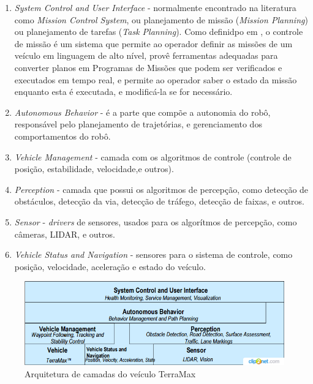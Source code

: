 \begin{enumerate}
  \item \textit{System Control and User Interface} - normalmente encontrado na
  literatura como \textit{Mission Control System}, ou planejamento de
missão (\textit{Mission Planning}) ou planejamento de tarefas (\textit{Task
Planning}). Como definidpo em \cite{fryxell1996navigation}, o controle de
missão é um sistema que permite ao operador definir as missões de um veículo em
linguagem de alto nível, provê ferramentas adequadas para converter planos em
Programas de Missões que podem ser verificados e executados em tempo real, e
permite ao operador saber o estado da missão enquanto esta é executada, e
modificá-la se for necessário.

  \item \textit{Autonomous Behavior} - é a parte que compõe a autonomia do robô,
  responsável pelo planejamento de trajetórias, e gerenciamento dos
  comportamentos do robô.
  
  \item \textit{Vehicle Management} - camada com os algoritmos de controle
  (controle de posição, estabilidade, velocidade,e  outros).
  
  \item \textit{Perception} - camada que possui os algoritmos de percepção, como
  detecção de obstáculos, detecção da via, detecção de tráfego, detecção de
  faixas, e outros.
  
  \item \textit{Sensor} - \textit{drivers} de sensores, usados para os
  algorítmos de percepção, como câmeras, LIDAR, e outros.
  
  \item \textit{Vehicle Status and Navigation} - sensores para o sistema de
  controle, como posição, velocidade, aceleração e estado do veículo.
\end{enumerate}
 
 \begin{figure}[!ht]
\centering
\includegraphics[width=\columnwidth]{figs/camadas.png}
\caption{Arquitetura de camadas do veículo TerraMax}
\label{fig:camadas}
\end{figure}
 
